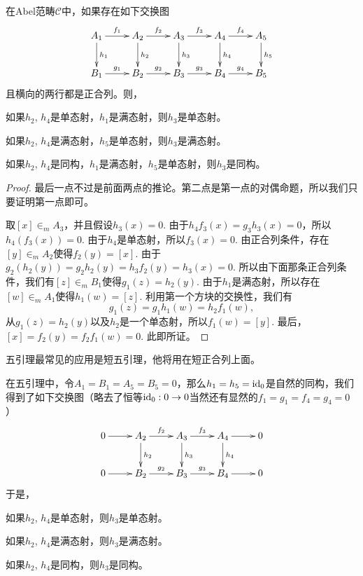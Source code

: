 \begin{lem}[五引理]\label{5-lem}
在Abel范畴$\mathcal{C}$中，如果存在如下交换图
\[
	\xymatrix{
	A_1\ar[r]^{f_1}\ar[d]^{h_1}&A_2\ar[r]^{f_2}\ar[d]^{h_2}&A_3\ar[r]^{f_3}\ar[d]^{h_3}&A_4\ar[r]^{f_4}\ar[d]^{h_4}&A_5\ar[d]^{h_5}\\
	B_1\ar[r]^{g_1}&B_2\ar[r]^{g_2}&B_3\ar[r]^{g_3}&B_4\ar[r]^{g_4}&B_5\\
	}
\]
且横向的两行都是正合列。则，
\begin{compactenum}[~~~(1)]
\item 如果$h_2$, $h_4$是单态射，$h_1$是满态射，则$h_3$是单态射。
\item 如果$h_2$, $h_4$是满态射，$h_5$是单态射，则$h_3$是满态射。
\item 如果$h_2$, $h_4$是同构，$h_1$是满态射，$h_5$是单态射，则$h_3$是同构。
\end{compactenum}
\end{lem}

\begin{proof}
最后一点不过是前面两点的推论。第二点是第一点的对偶命题，所以我们只要证明第一点即可。

取$[x]\in_m A_3$，并且假设$h_3(x)=0$. 由于$h_4f_3(x)=g_3h_3(x)=0$，所以$h_4(f_3(x))=0$. 由于$h_4$是单态射，所以$f_3(x)=0$. 由正合列条件，存在$[y]\in_m A_2$使得$f_2(y)=[x]$. 由于$g_2(h_2(y))=g_2h_2(y)=h_3f_2(y)=h_3(x)=0$. 所以由下面那条正合列条件，我们有$[z]\in_m B_1$使得$g_1(z)=h_2(y)$. 由于$h_1$是满态射，所以存在$[w]\in_m A_1$使得$h_1(w)=[z]$. 利用第一个方块的交换性，我们有
\[
	g_1(z)=g_1h_1(w)=h_2f_1(w),
\]
从$g_1(z)=h_2(y)$以及$h_2$是一个单态射，所以$f_1(w)=[y]$. 最后，$[x]=f_2(y)=f_2f_1(w)=0$. 此即所证。
\end{proof}

五引理最常见的应用是短五引理，他将用在短正合列上面。

\begin{lem}[短五引理]\label{short-5-lem}
在五引理中，令$A_1=B_1=A_5=B_5=0$，那么$h_1=h_5=\operatorname{id}_0$是自然的同构，我们得到了如下交换图（略去了恒等$\operatorname{id}_0:0\to 0$当然还有显然的$f_1=g_1=f_4=g_4=0$）
\[
	\xymatrix{
	0\ar[r]&A_2\ar[r]^{f_2}\ar[d]^{h_2}&A_3\ar[r]^{f_3}\ar[d]^{h_3}&A_4\ar[r]\ar[d]^{h_4}&0\\
	0\ar[r]&B_2\ar[r]^{g_2}&B_3\ar[r]^{g_3}&B_4\ar[r]&0\\
	}
\]
于是，
\begin{compactenum}[~~~(1)]
\item 如果$h_2$, $h_4$是单态射，则$h_3$是单态射。
\item 如果$h_2$, $h_4$是满态射，则$h_3$是满态射。
\item 如果$h_2$, $h_4$是同构，则$h_3$是同构。
\end{compactenum}
\end{lem}

